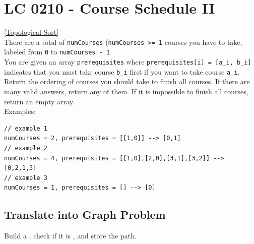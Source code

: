 \section{LC 0210 - Course Schedule II}\label{lc0210}
{\hyperref[sec:topological_sort]{[Topological Sort]}}\\

There are a total of {\colorbox{CodeBackground}{\lstinline|numCourses|}} ({\colorbox{CodeBackground}{\lstinline|numCourses >= 1|}} courses you have to take, labeled from {\colorbox{CodeBackground}{\lstinline|0|}} to {\colorbox{CodeBackground}{\lstinline|numCourses - 1|}}.\\

You are given an array {\colorbox{CodeBackground}{\lstinline|prerequisites|}} where {\colorbox{CodeBackground}{\lstinline|prerequisites[i] = [a_i, b_i]|}} indicates that you must take course {\colorbox{CodeBackground}{\lstinline|b_i|}} first if you want to take course {\colorbox{CodeBackground}{\lstinline|a_i|}}.\\

Return the ordering of courses you should take to finish all courses. If there are many valid answers, return any of them. If it is impossible to finish all courses, return an empty array.\\

Examples:
\begin{lstlisting}
// example 1
numCourses = 2, prerequisites = [[1,0]] --> [0,1]
// example 2
numCourses = 4, prerequisites = [[1,0],[2,0],[3,1],[3,2]] --> [0,2,1,3]
// example 3
numCourses = 1, prerequisites = [] --> [0]
\end{lstlisting}

\subsection*{Translate into Graph Problem}
Build a {\color{blue}{dependency graph}}, check if it is {\color{blue}{cyclic}}, and store the path.

